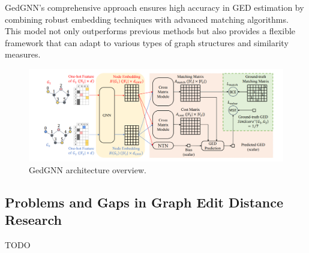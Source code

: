 \documentclass[../Thesis.tex]{subfiles}
\begin{document}
	GedGNN’s comprehensive approach ensures high accuracy in GED estimation by combining robust embedding techniques with advanced matching algorithms. This model not only outperforms previous methods but also provides a flexible framework that can adapt to various types of graph structures and similarity measures.
	
	\begin{figure}[H]
		\centering
		\includegraphics[width=\textwidth]{Images/gedgnn_architecture.png}
		\caption{GedGNN architecture overview.}
		\label{fig:gedgnn_architecture}
	\end{figure}
	
	\subsection{Problems and Gaps in Graph Edit Distance Research}
	TODO
	
\end{document}
